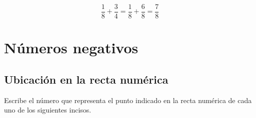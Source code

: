 \documentclass[12pt,addpoints]{evalua}
\begin{document}
\begin{questions}
\begin{parts}
            \begin{solutionbox}{1.8cm}
                  \[\dfrac{1}{8}+\dfrac{3}{4}=\dfrac{1}{8}+\dfrac{6}{8}=\dfrac{7}{8}\]
            \end{solutionbox}
      \end{parts}


	\section{Números negativos}

      
	\subsection{Ubicación en la recta numérica}

      \question[4] Escribe el número que representa el punto indicado en la recta numérica de cada uno de los siguientes incisos.

      \begin{multicols}{2}
\end{multicols}
\end{questions}
\end{document}
